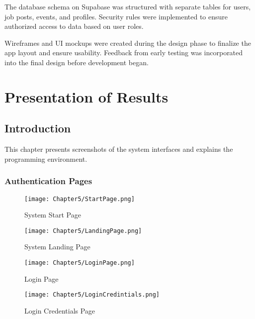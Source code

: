 \documentclass[12pt, a4paper]{report}
\begin{document}
The database schema on Supabase was structured with separate tables for users, job posts, events, and profiles. Security rules were implemented to ensure authorized access to data based on user roles.

Wireframes and UI mockups were created during the design phase to finalize the app layout and ensure usability. Feedback from early testing was incorporated into the final design before development began.

\newpage

\chapter{Presentation of Results}
\section{Introduction}
This chapter presents screenshots of the system interfaces and explains the programming environment.

\subsection{Authentication Pages}
\begin{figure}[htbp]
    \centering
    \begin{minipage}[b]{0.35\linewidth}
        \centering
        \texttt{[image: Chapter5/StartPage.png]}
        \caption{System Start Page}
        \label{fig:start-page}
    \end{minipage}
    \hfill
    \begin{minipage}[b]{0.35\linewidth}
        \centering
        \texttt{[image: Chapter5/LandingPage.png]}
        \caption{System Landing Page}
        \label{fig:landing-page}
    \end{minipage}
    \hfill
    \begin{minipage}[b]{0.35\linewidth}
        \centering
        \texttt{[image: Chapter5/LoginPage.png]}
        \caption{Login Page}
        \label{fig:login-page}
    \end{minipage}
    \hfill
    \begin{minipage}[b]{0.35\linewidth}
        \centering
        \texttt{[image: Chapter5/LoginCredintials.png]}
        \caption{Login Credentials Page}
        \label{fig:login-credentials}
    \end{minipage}
\end{figure}
\end{document}
